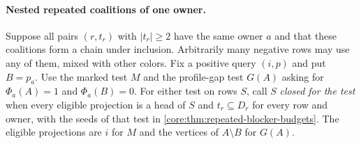 \paragraph{Nested repeated coalitions of one owner.}
Suppose all pairs $(r,t_r)$ with $|t_r|\ge2$ have the same owner $a$
and that these coalitions form a chain under inclusion. Arbitrarily
many negative rows may use any of them, mixed with other colors.
Fix a positive query $(i,p)$ and put $B=p_a$. Use the marked test $M$
and the profile-gap test $G(A)$ asking for $\Phi_a(A)=1$ and
$\Phi_a(B)=0$. For either test on rows $S$, call $S$ \emph{closed
for the test} when every eligible projection is a head of $S$ and
$t_r\subseteq D_r$ for every row and owner, with the seeds of that
test in \cref{core:thm:repeated-blocker-budgets}. The eligible
projections are $i$ for $M$ and the vertices of $A\setminus B$
for $G(A)$.

